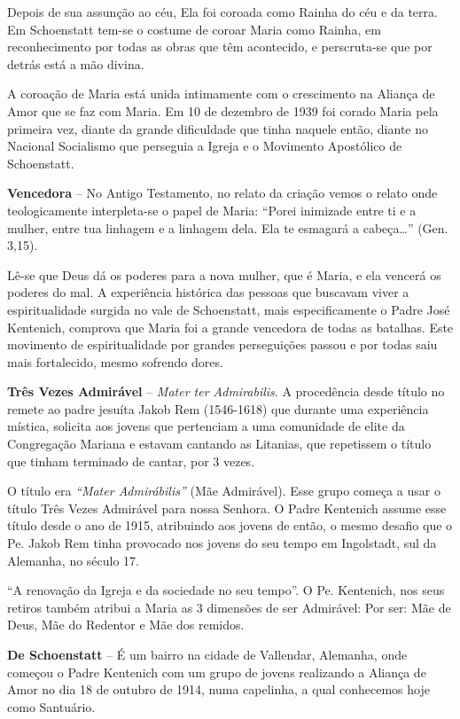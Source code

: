 \documentclass[a4paper,14pt]{extarticle} \usepackage[utf8]{inputenc}
\begin{document}
Depois de sua assunção ao céu, Ela foi coroada como Rainha do céu e da terra. Em Schoenstatt tem-se o costume de coroar Maria como Rainha, em reconhecimento por todas as obras que têm acontecido, e perscruta-se que por detrás está a mão divina.

A coroação de Maria está unida intimamente com o crescimento na Aliança de Amor que se faz com Maria. Em 10 de dezembro de 1939 foi corado Maria pela primeira vez, diante da grande dificuldade que tinha naquele então, diante no Nacional Socialismo que perseguia a Igreja e o Movimento Apostólico de Schoenstatt.

\textbf{Vencedora} – No Antigo Testamento, no relato da criação vemos o relato onde teologicamente interpleta-se o papel de Maria: “Porei inimizade entre ti e a mulher, entre tua linhagem e a linhagem dela. Ela te esmagará a cabeça…” (Gen. 3,15).

Lê-se que Deus dá os poderes para a nova mulher, que é Maria, e ela vencerá os poderes do mal. A experiência histórica das pessoas que buscavam viver a espiritualidade surgida no vale de Schoenstatt, mais especificamente o Padre José Kentenich, comprova que Maria foi a grande vencedora de todas as batalhas. Este movimento de espiritualidade por grandes perseguições passou e por todas saiu mais fortalecido, mesmo sofrendo dores.

\textbf{Três Vezes Admirável} – \textit{Mater ter Admirabilis}. A procedência desde título no remete ao padre jesuíta Jakob Rem (1546-1618) que durante uma experiência mística, solicita aos jovens que pertenciam a uma comunidade de elite da Congregação Mariana e estavam cantando as Litanias, que repetissem o título que tinham terminado de cantar, por 3 vezes.

O título era \textit{“Mater Admirábilis”} (Mãe Admirável). Esse grupo começa a usar o título Três Vezes Admirável para nossa Senhora.
O Padre Kentenich assume esse título desde o ano de 1915, atribuindo aos jovens de então, o mesmo desafio que o Pe. Jakob Rem tinha provocado nos jovens do seu tempo em Ingolstadt, sul da Alemanha, no século 17.

“A renovação da Igreja e da sociedade no seu tempo”. O Pe. Kentenich, nos seus retiros também atribui a Maria as 3 dimensões de ser Admirável: Por ser: Mãe de Deus, Mãe do Redentor e Mãe dos remidos.

\textbf{De Schoenstatt} – É um bairro na cidade de Vallendar, Alemanha, onde começou o Padre Kentenich com um grupo de jovens realizando a Aliança de Amor no dia 18 de outubro de 1914, numa capelinha, a qual conhecemos hoje como Santuário.
\end{document}
